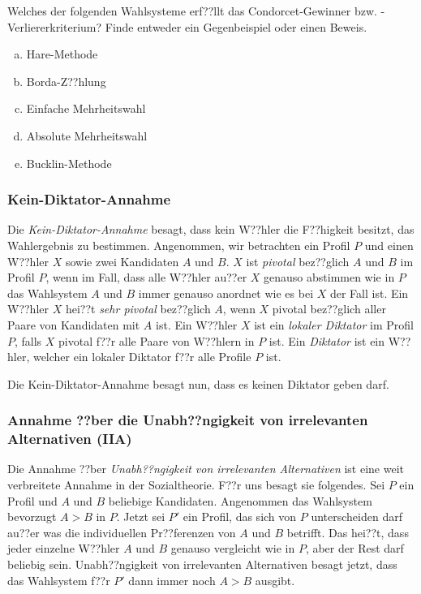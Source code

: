 \documentclass{zirkelblatt1415}
\theoremstyle{definition}
\theoremstyle{definition}
\theoremstyle{definition}
\theoremstyle{definition}
\theoremstyle{remark}
\begin{document}
\begin{aufgabe}{}
Welches der folgenden Wahlsysteme erf??llt das Condorcet-Gewinner bzw. -Verliererkriterium? Finde entweder ein Gegenbeispiel oder einen Beweis.
\begin{enumerate}[a)]
\item Hare-Methode
\item Borda-Z??hlung
\item Einfache Mehrheitswahl
\item Absolute Mehrheitswahl
\item Bucklin-Methode
\end{enumerate}
\end{aufgabe}



\subsubsection*{Kein-Diktator-Annahme}

Die \emph{Kein-Diktator-Annahme} besagt, dass kein W??hler die F??higkeit besitzt, das Wahlergebnis zu bestimmen. Angenommen, wir betrachten ein Profil $P$ und einen W??hler $X$ sowie zwei Kandidaten $A$ und $B$. $X$ ist \emph{pivotal} bez??glich $A$ und $B$ im Profil $P$, wenn im Fall, dass alle W??hler au??er $X$ genauso abstimmen wie in $P$ das Wahlsystem $A$ und $B$ immer genauso anordnet wie es bei $X$ der Fall ist. Ein W??hler $X$ hei??t \emph{sehr pivotal} bez??glich $A$, wenn $X$ pivotal bez??glich aller Paare von Kandidaten mit $A$ ist. Ein W??hler $X$ ist ein \emph{lokaler Diktator} im Profil $P$, falls $X$ pivotal f??r alle Paare von W??hlern in $P$ ist. Ein \emph{Diktator} ist ein W??hler, welcher ein lokaler Diktator f??r alle Profile $P$ ist.

Die Kein-Diktator-Annahme besagt nun, dass es keinen Diktator geben darf. 

\subsubsection*{Annahme ??ber die Unabh??ngigkeit von irrelevanten Alternativen (IIA)}

Die Annahme ??ber \emph{Unabh??ngigkeit von irrelevanten Alternativen} ist eine weit verbreitete Annahme in der Sozialtheorie. F??r uns besagt sie folgendes. Sei $P$ ein Profil und $A$ und $B$ beliebige Kandidaten. Angenommen das Wahlsystem bevorzugt $A>B$ in $P$. Jetzt sei $P'$ ein Profil, das sich von $P$ unterscheiden darf au??er was die individuellen Pr??ferenzen von $A$ und $B$ betrifft. Das hei??t, dass jeder einzelne W??hler $A$ und $B$ genauso vergleicht wie in $P$, aber der Rest darf beliebig sein. Unabh??ngigkeit von irrelevanten Alternativen besagt jetzt, dass das Wahlsystem f??r $P'$ dann immer noch $A>B$ ausgibt. 
\end{document}
